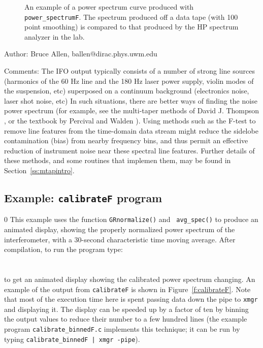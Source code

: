 \begin{figure}[hb]
\begin{center}
\caption{\label{f:pspecF} An example of a power spectrum curve produced
with {\tt power\_spectrumF}.  The spectrum produced off a data tape
(with 100 point smoothing) is compared to that produced by the HP
spectrum analyzer in the lab.}
\end{center}
\end{figure}

\begin{description}
\item{Author:}
Bruce Allen, ballen@dirac.phys.uwm.edu
\item{Comments:}
The IFO output typically consists of a number of strong line sources
(harmonics of the 60 Hz line and the 180 Hz laser power supply, violin
modes of the suspension, etc) superposed on a continuum background
(electronics noise, laser shot noise, etc)  In such situations, there
are better ways of finding the noise power spectrum (for example, see the
multi-taper methods of David J. Thompson \cite{thomson82}, or the textbook
by Percival and Walden \cite{percivalwalden}). Using methods such as the
F-test to remove line features from the time-domain data stream might
reduce the sidelobe contamination (bias) from nearby frequency bins,
and thus permit an effective reduction of instrument noise near these
spectral line features.  Further details of these methods, and some
routines that implemen them, may be found in Section~\ref{ss:mtapintro}.
\end{description}
\clearpage

\subsection{Example: {\tt calibrateF} program}
\setcounter{equation}0
This example uses the function {\tt GRnormalize()} and {\tt
avg\_spec()} to produce an animated display, showing the properly
normalized power spectrum of the interferometer, with a 30-second
characteristic time moving average.  After compilation, to run the
program type:\\
\\
 \\
to get an animated display showing the calibrated power spectrum
changing.  An example of the output from {\tt calibrateF} is shown in
Figure~\ref{f:calibrateF}.  Note that most of the execution time here is
spent passing data down the pipe to {\tt xmgr} and displaying it.  The
display can be speeded up by a factor of ten by binning the
output values to reduce their number to a few hundred lines (the example
program {\tt calibrate\_binnedF.c} implements this technique; it can be
run by typing {\tt calibrate\_binnedF | xmgr -pipe}).

